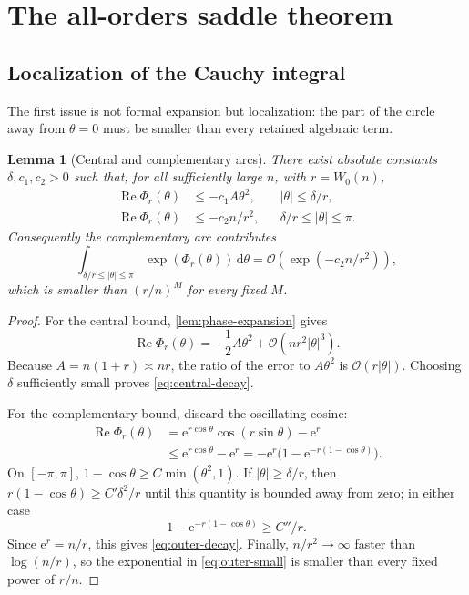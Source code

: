 \documentclass[11pt,a4paper]{article}
\newtheorem{lemma}[theorem]{Lemma}
\theoremstyle{definition}
\theoremstyle{remark}
\newcommand{\ee}{\mathrm e}
\newcommand{\dd}{\,\mathrm d}
\newcommand{\BigO}{\mathcal O}
\DeclareMathOperator{\RePart}{Re}
\begin{document}
\section{The all-orders saddle theorem}\label{sec:allorders}

\subsection{Localization of the Cauchy integral}

The first issue is not formal expansion but localization: the part of the circle
away from \(\theta=0\) must be smaller than every retained algebraic term.

\begin{lemma}[Central and complementary arcs]\label{lem:localization}
There exist absolute constants \(\delta,c_1,c_2>0\) such that, for all
sufficiently large \(n\), with \(r=W_0(n)\),
\begin{align}
 \RePart\Phi_r(\theta)&\le -c_1A\theta^2,
 && |\theta|\le \delta/r,\label{eq:central-decay}\\
 \RePart\Phi_r(\theta)&\le -c_2n/r^2,
 && \delta/r\le |\theta|\le\pi.\label{eq:outer-decay}
\end{align}
Consequently the complementary arc contributes
\begin{equation}\label{eq:outer-small}
 \int_{\delta/r\le|\theta|\le\pi}
       \exp(\Phi_r(\theta))\dd\theta
 =\BigO\!\left(\exp(-c_2n/r^2)\right),
\end{equation}
which is smaller than \((r/n)^M\) for every fixed \(M\).
\end{lemma}

\begin{proof}
For the central bound, \cref{lem:phase-expansion} gives
\[
 \RePart\Phi_r(\theta)
 =-\frac12A\theta^2+\BigO(nr^2|\theta|^3).
\]
Because \(A=n(1+r)\asymp nr\), the ratio of the error to
\(A\theta^2\) is \(\BigO(r|\theta|)\).  Choosing \(\delta\) sufficiently small
proves \cref{eq:central-decay}.

For the complementary bound, discard the oscillating cosine:
\begin{align*}
 \RePart\Phi_r(\theta)
 &=\ee^{r\cos\theta}\cos(r\sin\theta)-\ee^r\\
 &\le \ee^{r\cos\theta}-\ee^r
 =-\ee^r\bigl(1-\ee^{-r(1-\cos\theta)}\bigr).
\end{align*}
On \([-\pi,\pi]\), \(1-\cos\theta\ge C\min(\theta^2,1)\).  If
\(|\theta|\ge\delta/r\), then
\(r(1-\cos\theta)\ge C'\delta^2/r\) until this quantity is bounded away from
zero; in either case
\[
 1-\ee^{-r(1-\cos\theta)}\ge C''/r.
\]
Since \(\ee^r=n/r\), this gives \cref{eq:outer-decay}.  Finally,
\(n/r^2\to\infty\) faster than \(\log(n/r)\), so the exponential in
\cref{eq:outer-small} is smaller than every fixed power of \(r/n\).
\end{proof}
\end{document}
